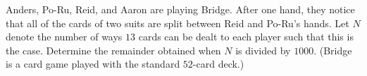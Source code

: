 Anders, Po-Ru, Reid, and Aaron are playing Bridge. After one hand, they notice that all of the cards of two suits are split between Reid and Po-Ru's hands. Let $N$ denote the number of ways $13$ cards can be dealt to each player such that this is the case. Determine the remainder obtained when $N$ is divided by $1000$. (Bridge is a card game played with the standard $52$-card deck.)
